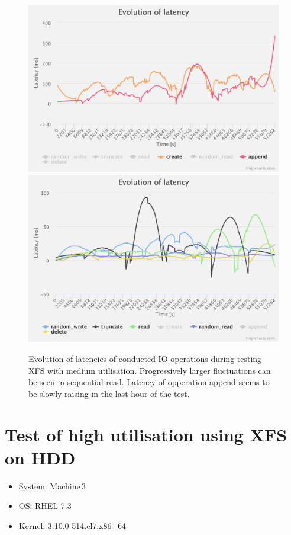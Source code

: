 \documentclass[
  color, %
  table, %
  lof,   %
  lot,   %
]{fithesis3}
\begin{document}
\begin{figure}[!htb]
    \centering
   \begin{minipage}{\textwidth}
        \centering
        \includegraphics[width=\textwidth]{../charts/HDD_xfs/low_ca}
        \includegraphics[width=\textwidth]{../charts/HDD_xfs/low_others}
        \caption[Evolution of latencies of XFS during testing of medium utilisation of HDD]{Evolution of latencies of conducted IO operations during testing XFS with medium utilisation. Progressively larger fluctuations can be seen in sequential read. Latency of opperation append seems to be slowly raising in the last hour of the test.}
\label{fig:lats80_xfs}
    \end{minipage}
\end{figure}

\clearpage

\section{Test of high utilisation using XFS on HDD}
\begin{itemize}
\itemsep0em 
   \item System: Machine\,3
   \item OS: RHEL-7.3
   \item Kernel: 3.10.0-514.el7.x86\_64
\end{itemize}
\end{document}
